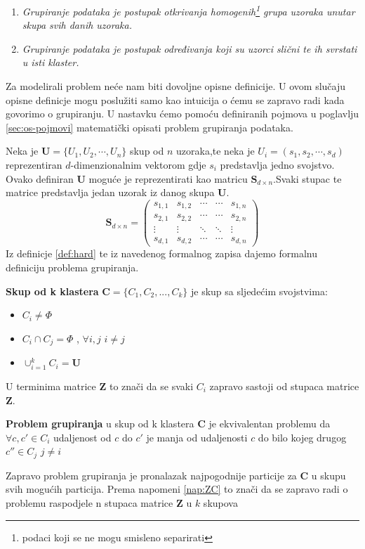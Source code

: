 \documentclass[a4paper,twoside,12pt]{memoir} %
\begin{document}
\begin{enumerate}
\item \textit{Grupiranje podataka je postupak otkrivanja homogenih\footnote{podaci koji se ne mogu smisleno separirati} grupa uzoraka unutar skupa svih danih uzoraka.}

\item \textit{Grupiranje podataka je postupak određivanja koji su uzorci slični te ih svrstati u isti klaster.}
\end{enumerate}
Za modelirali problem neće nam biti dovoljne opisne definicije. U ovom slučaju opisne definicje mogu poslužiti samo kao intuicija o ćemu se zapravo radi kada govorimo o grupiranju. U nastavku ćemo pomoću definiranih pojmova u poglavlju \ref{sec:os-pojmovi} matematički opisati problem grupiranja podataka.

Neka je $\mathbf{U} = \{U_1,U_2,\cdots,U_n\} $ skup od $n$ uzoraka,te neka je $U_i = (s_1,s_2,\cdots,s_d)$ reprezentiran $d$-dimenzionalnim vektorom gdje $s_i$ predstavlja jedno svojstvo. Ovako definiran $\mathbf{U}$ moguće je reprezentirati kao matricu $\mathbf{S}_{d\times n}$.Svaki stupac te matrice predstavlja jedan uzorak iz danog skupa $\mathbf{U}$.
\begin{equation}
\label{equ:matrica-uzoraka}
\mathbf{S}_{d \times n} = 
\begin{pmatrix}
s_{1,1} & s_{1,2} & \cdots & \cdots & s_{1,n}\\
s_{2,1} & s_{2,2} & \cdots & \cdots & s_{2,n}\\
\vdots & \vdots & \ddots & \ddots & \vdots\\
s_{d,1} & s_{d,2} & \cdots & \cdots & s_{d,n}
\end{pmatrix}
\end{equation}
Iz definicje \ref{def:hard} te iz navedenog formalnog zapisa dajemo formalnu definiciju problema grupiranja.
\begin{defn}
\label{def:k-klaster}
\textbf{Skup od k klastera} $\mathbf{C} = \{C_1,C_2,...,C_k\}$ je skup sa sljedećim svojstvima:
\begin{itemize}
\item $C_i \neq \Phi$
\item $C_i \cap C_j = \Phi$ , $\forall i,j$ $ i \neq j$
\item $\cup_{i=1}^{k}C_i = \mathbf{U} $
\end{itemize} 
\end{defn}
\begin{rem}
\label{nap:ZC}
U terminima matrice $\mathbf{Z}$ to znači da se svaki $C_i$ zapravo sastoji od stupaca matrice $\mathbf{Z}$.
\end{rem}
\begin{defn}
\label{def:hard-formal}
\textbf{Problem grupiranja} u skup od k klastera $\mathbf{C}$ je ekvivalentan problemu da\\
$\forall c, c' \in C_i$ udaljenost od $c$ do $c'$ je manja od udaljenosti $c$ do bilo kojeg drugog $c'' \in C_j$ $ j \neq i$ 
\end{defn}
Zapravo problem grupiranja je pronalazak najpogodnije particije za $\mathbf{C}$ u skupu svih mogućih particija.
Prema napomeni \ref{nap:ZC} to znači da se zapravo radi o problemu raspodjele n stupaca matrice $\mathbf{Z}$ u $k$ skupova 
\end{document}
